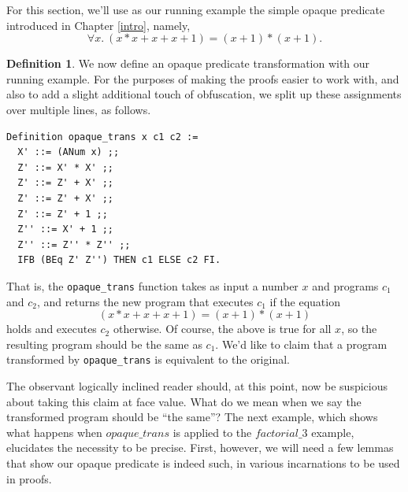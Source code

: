 \documentclass[12pt,notitlepage]{report}
\theoremstyle{plain}
\theoremstyle{definition}
\newtheorem{defin}[theo]{Definition}
\numberwithin{equation}{section}
\begin{document}
    For this section, we'll use as our running example the simple opaque predicate introduced in Chapter \ref{intro}, namely,
    \[
    	\forall x.\ (x * x + x + x + 1) = (x + 1) * (x + 1).
    \]
\begin{defin}
    We now define an opaque predicate transformation with our running example.  
    For the purposes of making the proofs easier to work with, and also to add a slight additional touch of obfuscation, we split up these assignments over multiple lines, as follows.
\begin{verbatim}
Definition opaque_trans x c1 c2 :=
  X' ::= (ANum x) ;;
  Z' ::= X' * X' ;;
  Z' ::= Z' + X' ;;
  Z' ::= Z' + X' ;;
  Z' ::= Z' + 1 ;;
  Z'' ::= X' + 1 ;;
  Z'' ::= Z'' * Z'' ;;
  IFB (BEq Z' Z'') THEN c1 ELSE c2 FI.
\end{verbatim}
That is, the \verb$opaque_trans$ function takes as input a number $x$ and programs $c_1$ and $c_2$, and returns the new program that executes $c_1$ if the equation
\[
	(x * x + x + x + 1) = (x + 1) * (x + 1)
\]
holds and executes $c_2$ otherwise.  Of course, the above is true for all $x$, so the resulting program should be the same as $c_1$.  We'd like to claim that a program transformed by \verb$opaque_trans$ is equivalent to the original.

\par The observant logically inclined reader should, at this point, now be suspicious about taking this claim at face value.  What do we mean when we say the transformed program should be ``the same''?  The next example, which shows what happens when $opaque\_trans$ is applied to the $factorial\_3$ example, elucidates the necessity to be precise.  First, however, we will need a few lemmas that show our opaque predicate is indeed such, in various incarnations to be used in proofs.
\end{defin}
\end{document}
